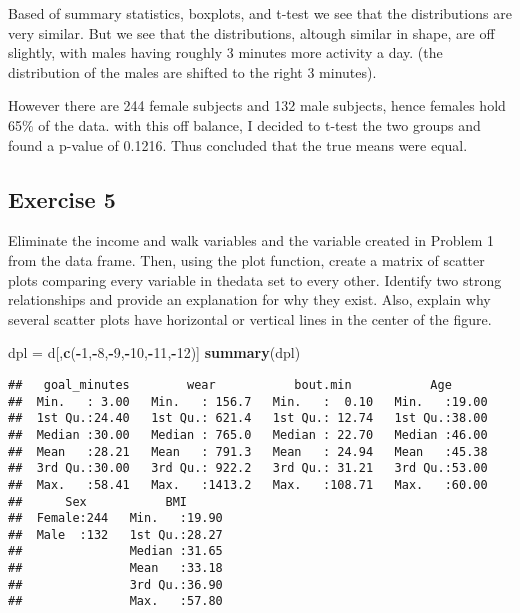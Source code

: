 \documentclass[]{article}
\newenvironment{Shaded}{\begin{snugshade}}{\end{snugshade}}
\newcommand{\KeywordTok}[1]{\textcolor[rgb]{0.13,0.29,0.53}{\textbf{#1}}}
\newcommand{\DecValTok}[1]{\textcolor[rgb]{0.00,0.00,0.81}{#1}}
\newcommand{\StringTok}[1]{\textcolor[rgb]{0.31,0.60,0.02}{#1}}
\newcommand{\OperatorTok}[1]{\textcolor[rgb]{0.81,0.36,0.00}{\textbf{#1}}}
\newcommand{\NormalTok}[1]{#1}
\begin{document}
Based of summary statistics, boxplots, and t-test we see that the
distributions are very similar. But we see that the distributions,
altough similar in shape, are off slightly, with males having roughly 3
minutes more activity a day. (the distribution of the males are shifted
to the right 3 minutes).

However there are 244 female subjects and 132 male subjects, hence
females hold 65\% of the data. with this off balance, I decided to
t-test the two groups and found a p-value of 0.1216. Thus concluded that
the true means were equal.

\subsection{Exercise 5}\label{exercise-5}

Eliminate the income and walk variables and the variable created in
Problem 1 from the data frame. Then, using the plot function, create a
matrix of scatter plots comparing every variable in thedata set to every
other. Identify two strong relationships and provide an explanation for
why they exist. Also, explain why several scatter plots have horizontal
or vertical lines in the center of the figure.

\begin{Shaded}
\begin{Highlighting}[]
\NormalTok{dpl =}\StringTok{ }\NormalTok{d[,}\KeywordTok{c}\NormalTok{(}\OperatorTok{-}\DecValTok{1}\NormalTok{,}\OperatorTok{-}\DecValTok{8}\NormalTok{,}\OperatorTok{-}\DecValTok{9}\NormalTok{,}\OperatorTok{-}\DecValTok{10}\NormalTok{,}\OperatorTok{-}\DecValTok{11}\NormalTok{,}\OperatorTok{-}\DecValTok{12}\NormalTok{)]}
\KeywordTok{summary}\NormalTok{(dpl)}
\end{Highlighting}
\end{Shaded}

\begin{verbatim}
##   goal_minutes        wear           bout.min           Age       
##  Min.   : 3.00   Min.   : 156.7   Min.   :  0.10   Min.   :19.00  
##  1st Qu.:24.40   1st Qu.: 621.4   1st Qu.: 12.74   1st Qu.:38.00  
##  Median :30.00   Median : 765.0   Median : 22.70   Median :46.00  
##  Mean   :28.21   Mean   : 791.3   Mean   : 24.94   Mean   :45.38  
##  3rd Qu.:30.00   3rd Qu.: 922.2   3rd Qu.: 31.21   3rd Qu.:53.00  
##  Max.   :58.41   Max.   :1413.2   Max.   :108.71   Max.   :60.00  
##      Sex           BMI       
##  Female:244   Min.   :19.90  
##  Male  :132   1st Qu.:28.27  
##               Median :31.65  
##               Mean   :33.18  
##               3rd Qu.:36.90  
##               Max.   :57.80
\end{verbatim}
\end{document}
